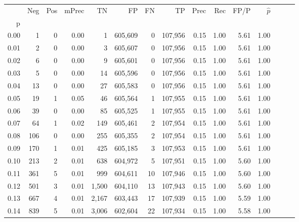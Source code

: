 \begin{tabular}{rrrrrrrrrrrrrrr}
\toprule
{} &     Neg &    Pos & mPrec &       TN &       FP &       FN &       TP &  Prec &   Rec &  FP/P & $\hat{p}$ \\
p    &         &        &       &          &          &          &          &       &       &       &           \\
\midrule
0.00 &       1 &      0 &  0.00 &        1 &  605,609 &        0 &  107,956 &  0.15 &  1.00 &  5.61 &      1.00 \\
0.01 &       2 &      0 &  0.00 &        3 &  605,607 &        0 &  107,956 &  0.15 &  1.00 &  5.61 &      1.00 \\
0.02 &       6 &      0 &  0.00 &        9 &  605,601 &        0 &  107,956 &  0.15 &  1.00 &  5.61 &      1.00 \\
0.03 &       5 &      0 &  0.00 &       14 &  605,596 &        0 &  107,956 &  0.15 &  1.00 &  5.61 &      1.00 \\
0.04 &      13 &      0 &  0.00 &       27 &  605,583 &        0 &  107,956 &  0.15 &  1.00 &  5.61 &      1.00 \\
0.05 &      19 &      1 &  0.05 &       46 &  605,564 &        1 &  107,955 &  0.15 &  1.00 &  5.61 &      1.00 \\
0.06 &      39 &      0 &  0.00 &       85 &  605,525 &        1 &  107,955 &  0.15 &  1.00 &  5.61 &      1.00 \\
0.07 &      64 &      1 &  0.02 &      149 &  605,461 &        2 &  107,954 &  0.15 &  1.00 &  5.61 &      1.00 \\
0.08 &     106 &      0 &  0.00 &      255 &  605,355 &        2 &  107,954 &  0.15 &  1.00 &  5.61 &      1.00 \\
0.09 &     170 &      1 &  0.01 &      425 &  605,185 &        3 &  107,953 &  0.15 &  1.00 &  5.61 &      1.00 \\
0.10 &     213 &      2 &  0.01 &      638 &  604,972 &        5 &  107,951 &  0.15 &  1.00 &  5.60 &      1.00 \\
0.11 &     361 &      5 &  0.01 &      999 &  604,611 &       10 &  107,946 &  0.15 &  1.00 &  5.60 &      1.00 \\
0.12 &     501 &      3 &  0.01 &    1,500 &  604,110 &       13 &  107,943 &  0.15 &  1.00 &  5.60 &      1.00 \\
0.13 &     667 &      4 &  0.01 &    2,167 &  603,443 &       17 &  107,939 &  0.15 &  1.00 &  5.59 &      1.00 \\
0.14 &     839 &      5 &  0.01 &    3,006 &  602,604 &       22 &  107,934 &  0.15 &  1.00 &  5.58 &      1.00 \\

\end{tabular}
